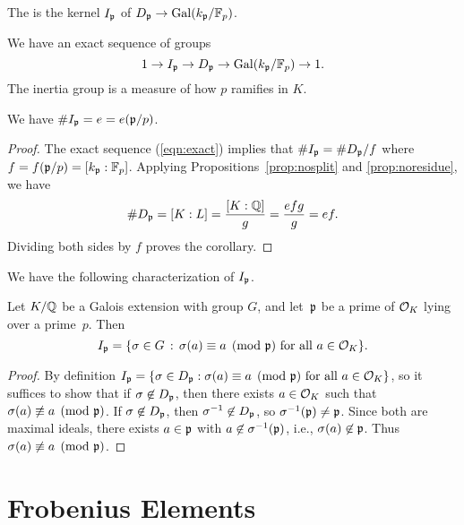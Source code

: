 \begin{definition}
The  is the kernel $I_{\mathfrak{p}}$ of $D_{\mathfrak{p}}\to\operatorname{Gal}(k_{\mathfrak{p}}/\mathbb{F}_p)$.
\end{definition}
We have an exact sequence of groups
\begin{equation}\label{eqn:exact}
   1 \to I_{\mathfrak{p}} \to D_{\mathfrak{p}} \to \operatorname{Gal}(k_{\mathfrak{p}}/\mathbb{F}_p)\to 1.
\end{equation}
The inertia group is a measure of how $p$ ramifies in $K$.
\begin{corollary}
We have $\# I_{\mathfrak{p}} = e = e(\mathfrak{p}/p)$.
\end{corollary}
\begin{proof}
The exact sequence (\ref{eqn:exact}) implies that
$\#I_{\mathfrak{p}} = \#D_{\mathfrak{p}} / f$ where $f = f(\mathfrak{p}/p) = [k_{\mathfrak{p}} : \mathbb{F}_p]$.
Applying Propositions~\ref{prop:nosplit} and \ref{prop:noresidue}, we have
$$\#D_{\mathfrak{p}} = [K:L] = \frac{[K:\mathbb{Q}]}{g} = \frac{efg}{g} = ef.$$
Dividing both sides by $f$ proves the corollary.
\end{proof}

We have the following characterization of $I_{\mathfrak{p}}$.
\begin{proposition}\label{prop:charip}
Let $K/\mathbb{Q}$ be a Galois extension with group $G$,
and let~$\mathfrak{p}$ be a prime of $\mathcal{O}_K$ lying
over a prime~$p$.  Then
$$
I_{\mathfrak{p}} = \{\sigma\in G \, :\, \sigma(a) \equiv a\pmod{\mathfrak{p}}\text{ for all } a\in\mathcal{O}_K\}.
$$
\end{proposition}
\begin{proof}
  By definition $I_{\mathfrak{p}} = \{\sigma\in D_{\mathfrak{p}} : \sigma(a) \equiv
  a\pmod{\mathfrak{p}}\text{ for all } a\in\mathcal{O}_K\}$, so it suffices to show that
  if $\sigma\not\in D_{\mathfrak{p}}$, then there exists $a\in\mathcal{O}_K$ such that
  $\sigma(a)\not\equiv a\pmod{\mathfrak{p}}$.  If $\sigma\not\in D_{\mathfrak{p}}$, then
  $\sigma^{-1}\not\in D_{\mathfrak{p}}$, so $\sigma^{-1}(\mathfrak{p})\neq \mathfrak{p}$.  Since both
  are maximal ideals, there exists $a\in\mathfrak{p}$ with
  $a\not\in\sigma^{-1}(\mathfrak{p})$, i.e., $\sigma(a)\not\in\mathfrak{p}$.  Thus
  $\sigma(a)\not\equiv a\pmod{\mathfrak{p}}$.
\end{proof}



\section{Frobenius Elements}

